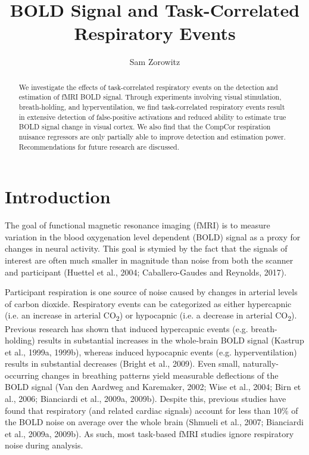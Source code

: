 \documentclass[9pt]{NEU502b-fmri}
\title{BOLD Signal and Task-Correlated Respiratory Events}
\author[1]{Sam Zorowitz}
\begin{document}
\maketitle

\begin{abstract}
We investigate the effects of task-correlated respiratory events on the detection and estimation of fMRI BOLD signal. Through experiments involving visual stimulation, breath-holding, and hyperventilation, we find task-correlated respiratory events result in extensive detection of false-positive activations and reduced ability to estimate true BOLD signal change in visual cortex. We also find that the CompCor respiration nuisance regressors are only partially able to improve detection and estimation power. Recommendations for future research are discussed.
\end{abstract}

\section{Introduction}

The goal of functional magnetic resonance imaging (fMRI) is to measure variation in the blood oxygenation level dependent (BOLD) signal as a proxy for changes in neural activity. This goal is stymied by the fact that the signals of interest are often much smaller in magnitude than noise from both the scanner and participant (Huettel et al., 2004; Caballero-Gaudes and Reynolds, 2017). 

Participant respiration is one source of noise caused by changes in arterial levels of carbon dioxide. Respiratory events can be categorized as either hypercapnic (i.e. an increase in arterial CO\textsubscript{2}) or hypocapnic (i.e. a decrease in arterial CO\textsubscript{2}). Previous research has shown that induced hypercapnic events (e.g. breath-holding) results in substantial increases in the whole-brain BOLD signal (Kastrup et al., 1999a, 1999b), whereas induced hypocapnic events (e.g. hyperventilation) results in substantial decreases (Bright et al., 2009). Even small, naturally-occurring changes in breathing patterns yield measurable deflections of the BOLD signal (Van den Aardweg and Karemaker, 2002; Wise et al., 2004; Birn et al., 2006; Bianciardi et al., 2009a, 2009b). Despite this, previous studies have found that respiratory (and related cardiac signals) account for less than 10\% of the BOLD noise on average over the whole brain (Shmueli et al., 2007; Bianciardi et al., 2009a, 2009b). As such, most task-based fMRI studies ignore respiratory noise during analysis.
\end{document}
